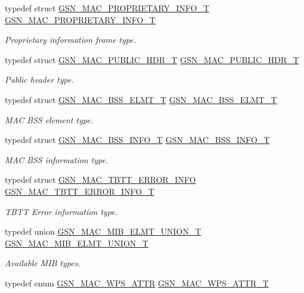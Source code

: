 \begin{DoxyCompactItemize}
typedef struct \hyperlink{a00123}{GSN\_\-MAC\_\-PROPRIETARY\_\-INFO\_\-T} \hyperlink{a00642_gaf102d7396d0f17159f993324bc63fc03}{GSN\_\-MAC\_\-PROPRIETARY\_\-INFO\_\-T}
\begin{DoxyCompactList}\small\item\em Proprietary information frame type. \end{DoxyCompactList}\item 
typedef struct \hyperlink{a00124}{GSN\_\-MAC\_\-PUBLIC\_\-HDR\_\-T} \hyperlink{a00642_ga83bfac29d319ebdbbc048906db949e06}{GSN\_\-MAC\_\-PUBLIC\_\-HDR\_\-T}
\begin{DoxyCompactList}\small\item\em Public header type. \end{DoxyCompactList}\item 
typedef struct \hyperlink{a00110}{GSN\_\-MAC\_\-BSS\_\-ELMT\_\-T} \hyperlink{a00642_ga741210948f906164f06f08b1b4705da8}{GSN\_\-MAC\_\-BSS\_\-ELMT\_\-T}
\begin{DoxyCompactList}\small\item\em MAC BSS element type. \end{DoxyCompactList}\item 
typedef struct \hyperlink{a00111}{GSN\_\-MAC\_\-BSS\_\-INFO\_\-T} \hyperlink{a00642_ga991bb63d940b90bac4f74912786f521d}{GSN\_\-MAC\_\-BSS\_\-INFO\_\-T}
\begin{DoxyCompactList}\small\item\em MAC BSS information type. \end{DoxyCompactList}\item 
typedef struct \hyperlink{a00134}{GSN\_\-MAC\_\-TBTT\_\-ERROR\_\-INFO} \hyperlink{a00642_ga172482aaa298a33c998f4206dd7e558a}{GSN\_\-MAC\_\-TBTT\_\-ERROR\_\-INFO\_\-T}
\begin{DoxyCompactList}\small\item\em TBTT Error information type. \end{DoxyCompactList}\item 
typedef union \hyperlink{a00117}{GSN\_\-MAC\_\-MIB\_\-ELMT\_\-UNION\_\-T} \hyperlink{a00642_ga64f7d136e7c2a14b7ea884d6ffd901c0}{GSN\_\-MAC\_\-MIB\_\-ELMT\_\-UNION\_\-T}
\begin{DoxyCompactList}\small\item\em Available MIB types. \end{DoxyCompactList}\item 
typedef enum \hyperlink{a00642_ga0ae19d69a0b381d883890df8a7812414}{GSN\_\-MAC\_\-WPS\_\-ATTR} \hyperlink{a00642_gaabc433282fb88ae2bc9ea6b726e4f049}{GSN\_\-MAC\_\-WPS\_\-ATTR\_\-T}

\end{DoxyCompactItemize}
